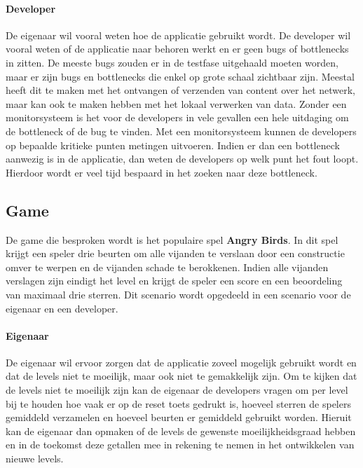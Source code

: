 \paragraph{Developer}
De eigenaar wil vooral weten hoe de applicatie gebruikt wordt. De developer wil vooral weten of de applicatie naar behoren werkt en er geen bugs of bottlenecks in zitten. De meeste bugs zouden er in de testfase uitgehaald moeten worden, maar er zijn bugs en bottlenecks die enkel op grote schaal zichtbaar zijn. Meestal heeft dit te maken met het ontvangen of verzenden van content over het netwerk, maar kan ook te maken hebben met het lokaal verwerken van data. Zonder een monitorsysteem is het voor de developers in vele gevallen een hele uitdaging om de bottleneck of de bug te vinden. Met een monitorsysteem kunnen de developers op bepaalde kritieke punten metingen uitvoeren. Indien er dan een bottleneck aanwezig is in de applicatie, dan weten de developers op welk punt het fout loopt. Hierdoor wordt er veel tijd bespaard in het zoeken naar deze bottleneck. \\



\subsection{Game}
De game die besproken wordt is het populaire spel \textbf{Angry Birds}. In dit spel krijgt een speler drie beurten om alle vijanden te verslaan door een constructie omver te werpen en de vijanden schade te berokkenen. Indien alle vijanden verslagen zijn eindigt het level en krijgt de speler een score en een beoordeling van maximaal drie sterren. Dit scenario wordt opgedeeld in een scenario voor de eigenaar en een developer.

\paragraph{Eigenaar}
De eigenaar wil ervoor zorgen dat de applicatie zoveel mogelijk gebruikt wordt en dat de levels niet te moeilijk, maar ook niet te gemakkelijk zijn. Om te kijken dat de levels niet te moeilijk zijn kan de eigenaar de developers vragen om per level bij te houden hoe vaak er op de reset toets gedrukt is, hoeveel sterren de spelers gemiddeld verzamelen en hoeveel beurten er gemiddeld gebruikt worden. Hieruit kan de eigenaar dan opmaken of de levels de gewenste moeilijkheidsgraad hebben en in de toekomst deze getallen mee in rekening te nemen in het ontwikkelen van nieuwe levels.

